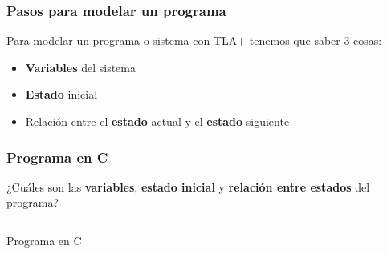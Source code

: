 \documentclass{beamer}
\begin{document}
\begin{frame}[fragile]
  \frametitle{Pasos para modelar un programa}

  Para modelar un programa o sistema con TLA+ tenemos que saber 3 cosas:

  \begin{itemize}
    \item \textbf{Variables} del sistema
    \item \textbf{Estado} inicial
    \item Relación entre el \textbf{estado} actual y el \textbf{estado} siguiente
  \end{itemize}
\end{frame}

\begin{frame}[fragile]
  \frametitle{Programa en C}

  ¿Cuáles son las \textbf{variables},
                  \textbf{estado inicial} y
                  \textbf{relación entre estados} del programa?

  \begin{listing}[H]
    \begin{center}
      \begin{minipage}{0.7\textwidth}
        \inputminted{c}{code/program.c}
      \end{minipage}
    \end{center}
    \caption{Programa en C}
    \label{lst:cprogram_2}
  \end{listing}
\end{frame}
\end{document}
